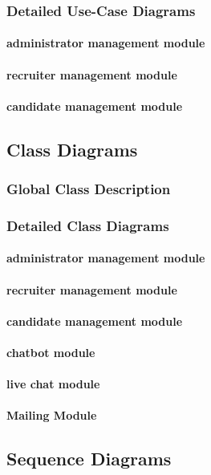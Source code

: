 \subsubsection{Detailed Use-Case Diagrams}
\paragraph{administrator management module}
\paragraph{recruiter  management module}
\paragraph{candidate  management module}
\subsection{Class Diagrams}
\subsubsection{Global Class Description}
\subsubsection{Detailed Class Diagrams}
\paragraph{administrator management module}
\paragraph{recruiter  management module}
\paragraph{candidate  management module}
\paragraph{chatbot module}
\paragraph{live chat module}
\paragraph{Mailing Module}
\subsection{Sequence Diagrams}
